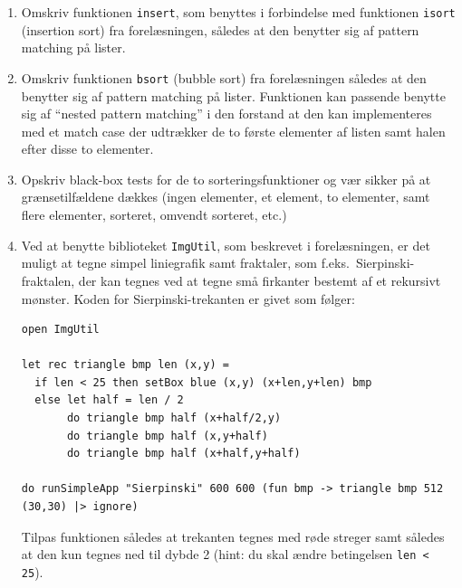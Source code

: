 \documentclass[a4paper,12pt]{article}
\begin{document}
\begin{enumerate}[label=7ø.\arabic*,start=0]
\item Omskriv funktionen \lstinline{insert}, som benyttes i forbindelse
  med funktionen \lstinline{isort} (insertion sort) fra forelæsningen,
  således at den benytter sig af pattern matching på lister.
\item Omskriv funktionen \texttt{bsort} (bubble sort) fra
  forelæsningen således at den benytter sig af pattern matching på
  lister. Funktionen kan passende benytte sig af ``nested pattern
  matching'' i den forstand at den kan implementeres med et match case
  der udtrækker de to første elementer af listen samt halen efter
  disse to elementer.
\item Opskriv black-box tests for de to sorteringsfunktioner og vær
  sikker på at grænsetilfældene dækkes (ingen elementer, et element,
  to elementer, samt flere elementer, sorteret, omvendt sorteret, etc.)
\item\label{sierpinski.ov} Ved at benytte biblioteket \texttt{ImgUtil}, som beskrevet i
  forelæsningen, er det muligt at tegne simpel liniegrafik samt
  fraktaler, som f.eks.\ Sierpinski-fraktalen, der kan tegnes ved at
  tegne små firkanter bestemt af et rekursivt mønster. Koden for
  Sierpinski-trekanten er givet som følger:
\begin{lstlisting}[numbers=none,frame=none,mathescape]
open ImgUtil

let rec triangle bmp len (x,y) =
  if len < 25 then setBox blue (x,y) (x+len,y+len) bmp
  else let half = len / 2
       do triangle bmp half (x+half/2,y)
       do triangle bmp half (x,y+half)
       do triangle bmp half (x+half,y+half)

do runSimpleApp "Sierpinski" 600 600 (fun bmp -> triangle bmp 512 (30,30) |> ignore)
\end{lstlisting}

Tilpas funktionen således at trekanten tegnes med røde streger samt
således at den kun tegnes ned til dybde 2 (hint: du skal ændre betingelsen \lstinline{len < 25}).


\end{enumerate}
\end{document}
